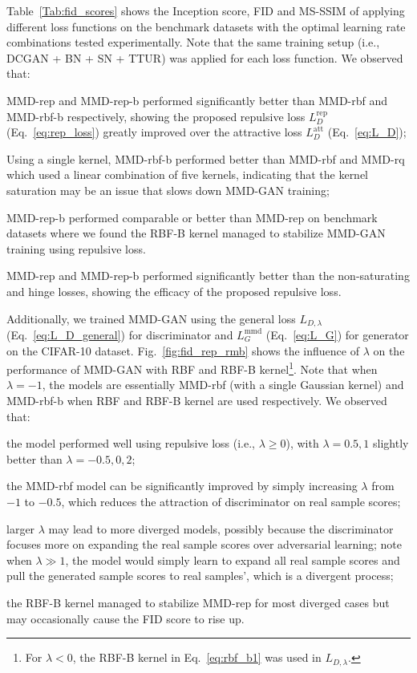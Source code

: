 \documentclass{article} %
\theoremstyle{plain}
\newtheorem*{proposition 1*}{Proposition 1}
\begin{document}
Table~\ref{Tab:fid_scores} shows the Inception score, FID and MS-SSIM of applying different loss functions on the benchmark datasets with the optimal learning rate combinations tested experimentally. Note that the same training setup (i.e., DCGAN + BN + SN + TTUR) was applied for each loss function. We observed that: 
\begin{enumerate*}[label=\arabic*)]
	\item MMD-rep and MMD-rep-b performed significantly better than MMD-rbf and MMD-rbf-b respectively, showing the proposed repulsive loss \(L_{D}^{\text{rep}}\) (Eq.~\ref{eq:rep_loss})
	greatly improved over the attractive loss \(L_{D}^{\text{att}}\) (Eq.~\ref{eq:L_D}); 
	\item Using a single kernel, MMD-rbf-b performed better than MMD-rbf and MMD-rq which used a linear combination of five kernels, indicating that the kernel saturation may be an issue that slows down MMD-GAN training;
	\item MMD-rep-b performed comparable or better than MMD-rep on benchmark datasets where we found the RBF-B kernel managed to stabilize MMD-GAN training using repulsive loss. 
	\item MMD-rep and MMD-rep-b performed significantly better than the non-saturating and hinge losses, showing the efficacy of the proposed repulsive loss.
\end{enumerate*} 

Additionally, we trained MMD-GAN using the general loss \(L_{D,\lambda}\) (Eq.~\ref{eq:L_D_general}) for discriminator and \(L_{G}^{\text{mmd}}\) (Eq.~\ref{eq:L_G}) for generator on the CIFAR-10 dataset. Fig.~\ref{fig:fid_rep_rmb} shows the influence of \(\lambda\) on the performance of MMD-GAN with RBF and RBF-B kernel\footnote{For \(\lambda<0\), the RBF-B kernel in Eq.~\ref{eq:rbf_b1} was used in \(L_{D,\lambda}\).}. Note that when \(\lambda=-1\), the models are essentially MMD-rbf (with a single Gaussian kernel) and MMD-rbf-b when RBF and RBF-B kernel are used respectively. We observed that:
\begin{enumerate*}[label=\arabic*)]
	\item the model performed well using repulsive loss (i.e., \(\lambda\ge0\)), with \(\lambda=0.5,1\) slightly better than \(\lambda=-0.5,0,2\);
	\item the MMD-rbf model can be significantly improved by simply increasing \(\lambda\) from \(-1\) to \(-0.5\), which reduces the attraction of discriminator on real sample scores;
	\item larger \(\lambda\) may lead to more diverged models, possibly because the discriminator focuses more on expanding the real sample scores over adversarial learning; note when \(\lambda\gg1\), the model would simply learn to expand all real sample scores and pull the generated sample scores to real samples', which is a divergent process; 
	\item the RBF-B kernel managed to stabilize MMD-rep for most diverged cases but may occasionally cause the FID score to rise up.
\end{enumerate*}
\end{document}
